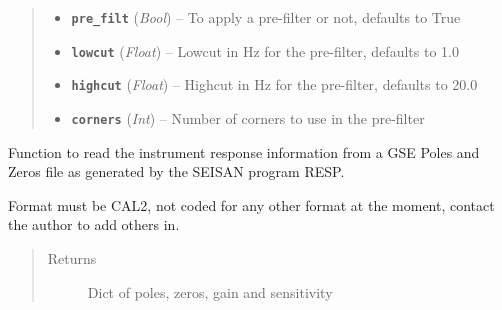 \documentclass[a4paper,10pt,english]{sphinxmanual}
\begin{document}
\begin{fulllineitems}
\begin{quote}
\begin{description}
\begin{itemize}
\item {} 
\textbf{\texttt{pre\_filt}} (\emph{Bool}) -- To apply a pre-filter or not, defaults to True

\item {} 
\textbf{\texttt{lowcut}} (\emph{Float}) -- Lowcut in Hz for the pre-filter, defaults to 1.0

\item {} 
\textbf{\texttt{highcut}} (\emph{Float}) -- Highcut in Hz for the pre-filter, defaults to 20.0

\item {} 
\textbf{\texttt{corners}} (\emph{Int}) -- Number of corners to use in the pre-filter

\end{itemize}

\end{description}\end{quote}

\end{fulllineitems}


\begin{fulllineitems}
\label{modules:mag_calc._GSE2_PAZ_read}
Function to read the instrument response information from a GSE Poles and
Zeros file as generated by the SEISAN program RESP.

Format must be CAL2, not coded for any other format at the moment, contact
the author to add others in.
\begin{quote}\begin{description}
\item[{Returns}] \leavevmode
Dict of poles, zeros, gain and sensitivity

\end{description}\end{quote}

\end{fulllineitems}

\end{document}
